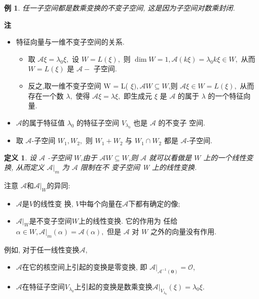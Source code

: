 \documentclass[13pt]{beamer}
\newtheorem{exa}{例}
\newtheorem*{defi}{定义}
\def\A{\mathscr{A}}
\def\O{\mathscr{O}}
\def\0{\mathbf{0}}
\begin{document}
\begin{frame}
\begin{exa}
	任一子空间都是数乘变换的不变子空间, 这是因为子空间对数乘封闭.
\end{exa}
{\bf 注~~ }

\begin{itemize}
	\item 特征向量与一维不变子空间的关系.

\begin{itemize}
	\item 取 $\A  \xi=\lambda_{0} \xi,$ 设 $W=L(\xi),$ 则 $\operatorname{dim} W=1, \A (k \xi)=\lambda_{0} k \xi \in W,$ 从而 $W=L(\xi)$ 是 $\A -$ 子空间.
	\item 反之,取一维不变子空间 W = L( $\xi), \A  W \subseteq W$,则 $\A  \xi \in W=L(\xi),$ 从而存在一个数 $\lambda,$ 使得 $\A  \xi=\lambda \xi,$ 即生成元 $\xi$ 是 $\A $ 的属于 $\lambda$ 的一个特征向量.
\end{itemize}

\item $\A$的属于特征值 $\lambda_{0}$ 的特征子空间 $V_{\lambda_{0}}$ 也是 $\mathscr{A}$ 的不变子
空间.

\item 取 $\A$-子空间 $W_{1}, W_{2},$ 则 $W_{1}+W_{2}$ 与 $W_{1} \cap W_{2}$ 都是 $\A$-子空间.

\end{itemize}

\end{frame}


\begin{frame}
\begin{defi}
设 $\A $ -子空间 $W$,由于 $\A  W \subseteq W$,则 $\A $ 就可以看做是 $W$ 上的一个线性变换, 
从而定义 $\left.\A \right|_{m}$ 为 $\A$ \alert{限制}在不
变子空间 W 上的线性变换.
\end{defi}



注意 $\A$和$\A|_W$的异同: 
\begin{itemize}
\item $\A$是$V$的线性变
换, $V$中每个向量在$\A$下都有确定的像; 
\item $\A|_W$是不变子空间$W$上的线性变换. 
它的作用为
任给 $\alpha \in W,\left.\A \right|_{m}(\alpha)=\A (\alpha),$ 但是 $\A $ 对 $W$ 之外的向量没有作用.

\end{itemize}

例如, 对于任一线性变换$\A$,
\begin{itemize}
\item  $\A$在它的核空间上引起的变换是零变换, 即 $\A |_{\A^{-1}(\0)} = \O$,
\item $\A$在特征子空间$V_{\lambda_0}$上引起的变换是数乘变换$\A|_{V_{\lambda_0}}(\xi)=\lambda_0 \xi$.
\end{itemize}
\end{frame}
\end{document}
